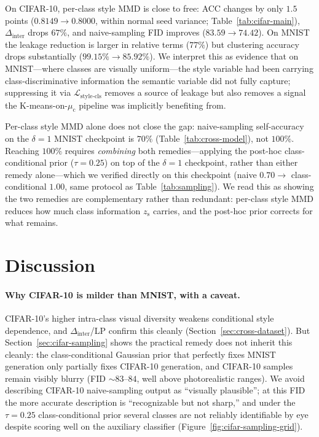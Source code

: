 \documentclass[10pt,letterpaper]{article}
\newcommand{\zs}{z_{\mathrm{s}}}
\newcommand{\muc}{\mu_{\mathrm{c}}}
\begin{document}
On CIFAR-10, per-class style MMD is close to free: ACC changes by only
$1.5$ points ($0.8149\to0.8000$, within normal seed variance;
Table~\ref{tab:cifar-main}), $\Delta_{\mathrm{inter}}$ drops $67\%$, and
naive-sampling FID improves ($83.59\to74.42$). On MNIST the leakage
reduction is larger in relative terms ($77\%$) but clustering accuracy drops
substantially ($99.15\%\to85.92\%$). We interpret this as evidence that on
MNIST---where classes are visually uniform---the style variable had been
carrying class-discriminative information the semantic variable did not
fully capture; suppressing it via $\mathcal{L}_{\mathrm{style\text{-}cls}}$
removes a source of leakage but also removes a signal the K-means-on-$\muc$
pipeline was implicitly benefiting from.

Per-class style MMD alone does not close the gap: naive-sampling
self-accuracy on the $\delta{=}1$ MNIST checkpoint is $70\%$
(Table~\ref{tab:cross-model}), not $100\%$. Reaching $100\%$ requires
\emph{combining} both remedies---applying the post-hoc class-conditional
prior ($\tau{=}0.25$) on top of the $\delta{=}1$ checkpoint, rather than
either remedy alone---which we verified directly on this checkpoint (naive
$0.70\to$ class-conditional $1.00$, same protocol as
Table~\ref{tab:sampling}). We read this as showing the two remedies are
complementary rather than redundant: per-class style MMD reduces how much
class information $\zs$ carries, and the post-hoc prior corrects for what
remains.

\section{Discussion}
\label{sec:discussion}

\paragraph{Why CIFAR-10 is milder than MNIST, with a caveat.}
CIFAR-10's higher intra-class visual diversity weakens conditional style
dependence, and $\Delta_{\mathrm{inter}}$/LP confirm this cleanly
(Section~\ref{sec:cross-dataset}). But Section~\ref{sec:cifar-sampling}
shows the practical remedy does not inherit this cleanly: the
class-conditional Gaussian prior that perfectly fixes MNIST generation only
partially fixes CIFAR-10 generation, and CIFAR-10 samples remain visibly
blurry (FID $\sim\!83$--$84$, well above photorealistic ranges). We avoid
describing CIFAR-10 naive-sampling output as ``visually plausible''; at this
FID the more accurate description is ``recognizable but not sharp,'' and
under the $\tau{=}0.25$ class-conditional prior several classes are not
reliably identifiable by eye despite scoring well on the auxiliary
classifier (Figure~\ref{fig:cifar-sampling-grid}).
\end{document}
